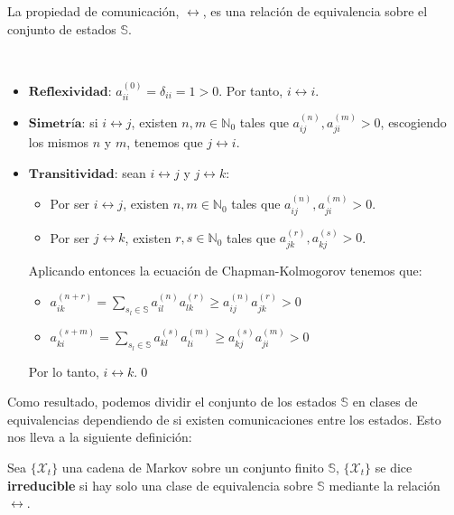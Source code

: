 \begin{theorem}
    La propiedad de comunicación, $\longleftrightarrow$, es una relación de equivalencia sobre el conjunto de estados $\mathbb{S}$.
\end{theorem}
\begin{proofs*}
    \
    \begin{itemize}
        \item $\textbf{Reflexividad: } a_{ii}^{(0)}=\delta_{ii}=1>0$. Por tanto, $i\longleftrightarrow i$.
        \item $\textbf{Simetría:}$ si $i\longleftrightarrow j$, existen $n,m\in\mathbb{N}_0$ tales que $a_{ij}^{(n)}, a_{ji}^{(m)}>0$, escogiendo los mismos $n$ y $m$, tenemos que $j\longleftrightarrow i$.
        \item $\textbf{Transitividad:}$ sean $i\longleftrightarrow j$ y $j\longleftrightarrow k$:
        \begin{itemize}
            \item Por ser $i\longleftrightarrow j$, existen $n,m\in\mathbb{N}_0$ tales que $a_{ij}^{(n)}, a_{ji}^{(m)}>0$.
            \item Por ser $j\longleftrightarrow k$, existen $r,s\in\mathbb{N}_0$ tales que $a_{jk}^{(r)}, a_{kj}^{(s)}>0$.
        \end{itemize}
        Aplicando entonces la ecuación de Chapman-Kolmogorov tenemos que:
        \begin{itemize}
            \item $a_{ik}^{(n+r)}=\sum\limits_{s_l\in\mathbb{S}}a_{il}^{(n)}a_{lk}^{(r)}\geq a_{ij}^{(n)}a_{jk}^{(r)}>0$
            \item $a_{ki}^{(s+m)}=\sum\limits_{s_l\in\mathbb{S}}a_{kl}^{(s)}a_{li}^{(m)}\geq a_{kj}^{(s)}a_{ji}^{(m)}>0$
        \end{itemize}
        Por lo tanto, $i\longleftrightarrow k$.\qed
    \end{itemize}
\end{proofs*}

Como resultado, podemos dividir el conjunto de los estados $\mathbb{S}$ en clases de equivalencias dependiendo de si existen comunicaciones entre los estados. Esto nos lleva a la siguiente definición:
\begin{definition}
    Sea $\{\mathcal{X}_t\}$ una cadena de Markov sobre un conjunto finito $\mathbb{S}$, $\{\mathcal{X}_t\}$ se dice \textbf{irreducible} si hay solo una clase de equivalencia sobre $\mathbb{S}$ mediante la relación $\longleftrightarrow$.
\end{definition}

